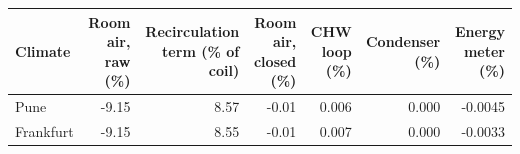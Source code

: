 \begin{tabular}{lrrrrrr}
\toprule
Climate & Room air, raw (\%) & Recirculation term (\% of coil) & Room air, closed (\%) & CHW loop (\%) & Condenser (\%) & Energy meter (\%)\\
\midrule
Pune & -9.15 & 8.57 & -0.01 & 0.006 & 0.000 & -0.0045\\
Frankfurt & -9.15 & 8.55 & -0.01 & 0.007 & 0.000 & -0.0033\\
\bottomrule
\end{tabular}
